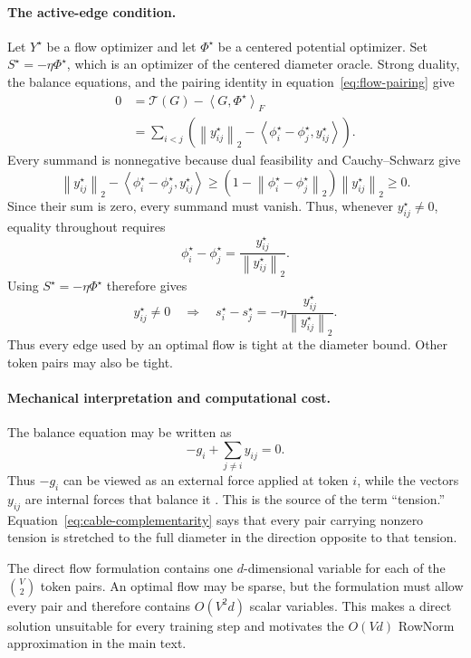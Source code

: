 \documentclass[anon]{opt2026} %
\newcommand{\norm}[1]{\left\lVert #1\right\rVert}
\newcommand{\inner}[2]{\left\langle #1,#2\right\rangle}
\begin{document}
\paragraph{The active-edge condition.}
Let $Y^\star$ be a flow optimizer and let $\Phi^\star$ be a centered
potential optimizer. Set $S^\star=-\eta\Phi^\star$, which is an optimizer of
the centered diameter oracle. Strong duality, the balance equations, and the pairing identity in equation~\ref{eq:flow-pairing} give
\[
\begin{aligned}
0
&=
\mathcal T(G)-\inner{G}{\Phi^\star}_F \\
&=
\sum_{i<j}
\left(
\norm{y_{ij}^\star}_2
-
\inner{\phi_i^\star-\phi_j^\star}{y_{ij}^\star}
\right).
\end{aligned}
\]
Every summand is nonnegative because dual feasibility and
Cauchy--Schwarz give
\[
\norm{y_{ij}^\star}_2
-
\inner{\phi_i^\star-\phi_j^\star}{y_{ij}^\star}
\geq
\left(
1-\norm{\phi_i^\star-\phi_j^\star}_2
\right)
\norm{y_{ij}^\star}_2
\geq0.
\]
Since their sum is zero, every summand must vanish. Thus, whenever
$y_{ij}^\star\neq0$, equality throughout requires
\[
\phi_i^\star-\phi_j^\star
=
\frac{y_{ij}^\star}{\norm{y_{ij}^\star}_2}.
\]
Using $S^\star=-\eta\Phi^\star$ therefore gives
\begin{equation}
y_{ij}^\star\neq0
\quad\Longrightarrow\quad
s_i^\star-s_j^\star
=
-\eta\frac{y_{ij}^\star}{\norm{y_{ij}^\star}_2}.
\label{eq:cable-complementarity}
\end{equation}
Thus every edge used by an optimal flow is tight at the diameter bound.
Other token pairs may also be tight.


\paragraph{Mechanical interpretation and computational cost.}
The balance equation may be written as
\[
-g_i+\sum_{j\neq i}y_{ij}=0.
\]
Thus $-g_i$ can be viewed as an external force applied at token $i$, while the
vectors $y_{ij}$ are internal forces that balance it
\citep{ciosmak2021matrixholdersinequalitydivergence}. This is the source of
the term ``tension.'' Equation~\ref{eq:cable-complementarity} says that every
pair carrying nonzero tension is stretched to the full diameter in the
direction opposite to that tension.

The direct flow formulation contains one $d$-dimensional variable for each of
the $\binom{V}{2}$ token pairs. An optimal flow may be sparse, but the
formulation must allow every pair and therefore contains $O(V^2d)$ scalar
variables. This makes a direct solution unsuitable for every training step
and motivates the $O(Vd)$ RowNorm approximation in the main text.
\end{document}
